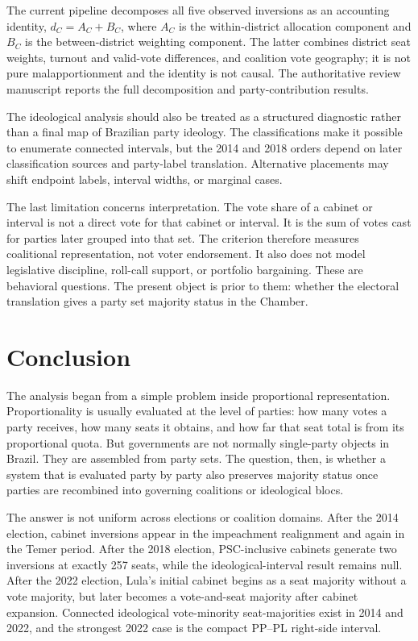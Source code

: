 \documentclass[11pt]{article}
\begin{document}
The current pipeline decomposes all five observed inversions as an accounting
identity, \(d_C=A_C+B_C\), where \(A_C\) is the within-district allocation
component and \(B_C\) is the between-district weighting component. The latter
combines district seat weights, turnout and valid-vote differences, and coalition
vote geography; it is not pure malapportionment and the identity is not causal.
The authoritative review manuscript reports the full decomposition and
party-contribution results.

The ideological analysis should also be treated as a structured diagnostic rather
than a final map of Brazilian party ideology. The classifications make it possible
to enumerate connected intervals, but the 2014 and 2018 orders depend on later
classification sources and party-label translation. Alternative placements may
shift endpoint labels, interval widths, or marginal cases.

The last limitation concerns interpretation. The vote share of a cabinet or
interval is not a direct vote for that cabinet or interval. It is the sum of votes
cast for parties later grouped into that set. The criterion therefore measures
coalitional representation, not voter endorsement. It also does not model
legislative discipline, roll-call support, or portfolio bargaining. These are
behavioral questions. The present object is prior to them: whether the electoral
translation gives a party set majority status in the Chamber.


\section{Conclusion}

The analysis began from a simple problem inside proportional representation.
Proportionality is usually evaluated at the level of parties: how many votes a
party receives, how many seats it obtains, and how far that seat total is from
its proportional quota. But governments are not normally single-party objects in
Brazil. They are assembled from party sets. The question, then, is whether a
system that is evaluated party by party also preserves majority status once
parties are recombined into governing coalitions or ideological blocs.

The answer is not uniform across elections or coalition domains. After the 2014
election, cabinet inversions appear in the impeachment realignment and again in
the Temer period. After the 2018 election, PSC-inclusive cabinets generate two
inversions at exactly 257 seats, while the ideological-interval result remains
null. After the 2022 election, Lula's initial cabinet begins as a seat majority
without a vote majority, but later becomes a vote-and-seat majority after
cabinet expansion. Connected ideological vote-minority seat-majorities exist in
2014 and 2022, and the strongest 2022 case is the compact PP--PL right-side
interval.
\end{document}
